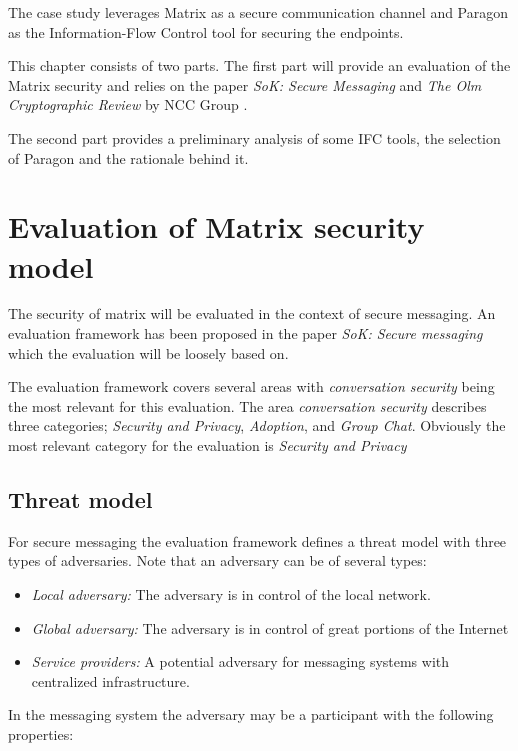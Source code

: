 The case study leverages Matrix as a secure communication channel and Paragon as the Information-Flow Control tool for securing the endpoints. 

This chapter consists of two parts. The first part will provide an evaluation of the Matrix security and relies on the paper \emph{SoK: Secure Messaging} \cite{sok} and \emph{The Olm Cryptographic Review} by NCC Group \cite{ncc}. 

The second part provides a preliminary analysis of some IFC tools, the selection of Paragon and the rationale behind it.


\section{Evaluation of Matrix security model}\label{evaluationofmatrix}
The security of matrix will be evaluated in the context of secure messaging. An evaluation framework has been proposed in the paper \emph{SoK: Secure messaging} which the evaluation will be loosely based on. 

The evaluation framework covers several areas with \emph{conversation security} being the most relevant for this evaluation. The area \emph{conversation security} describes three categories; \emph{Security and Privacy}, \emph{Adoption}, and \emph{Group Chat}. Obviously the most relevant category for the evaluation is \emph{Security and Privacy}

\subsection{Threat model}
For secure messaging the evaluation framework defines a threat model with three types of adversaries. Note that an adversary can be of several types:

\begin{itemize}
	\item \emph{Local adversary:} The adversary is in control of the local network.
	\item \emph{Global adversary:} The adversary is in control of great portions of the Internet 
	\item \emph{Service providers:} A potential adversary for messaging systems with centralized infrastructure.
\end{itemize}

In the messaging system the adversary may be a participant with the following properties:

